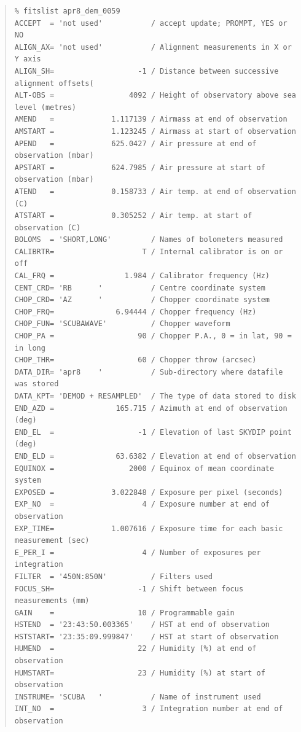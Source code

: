 \documentclass[twoside,11pt]{article}
\newenvironment{myquote}{\begin{quote}\begin{small}}{\end{small}\end{quote}}
\renewcommand{\_}{\texttt{\symbol{95}}}
\begin{document}
\begin{myquote}
\begin{verbatim}
% fitslist apr8_dem_0059
ACCEPT  = 'not used'           / accept update; PROMPT, YES or NO
ALIGN_AX= 'not used'           / Alignment measurements in X or Y axis
ALIGN_SH=                   -1 / Distance between successive alignment offsets(
ALT-OBS =                 4092 / Height of observatory above sea level (metres)
AMEND   =             1.117139 / Airmass at end of observation
AMSTART =             1.123245 / Airmass at start of observation
APEND   =             625.0427 / Air pressure at end of observation (mbar)
APSTART =             624.7985 / Air pressure at start of observation (mbar)
ATEND   =             0.158733 / Air temp. at end of observation (C)
ATSTART =             0.305252 / Air temp. at start of observation (C)
BOLOMS  = 'SHORT,LONG'         / Names of bolometers measured
CALIBRTR=                    T / Internal calibrator is on or off
CAL_FRQ =                1.984 / Calibrator frequency (Hz)
CENT_CRD= 'RB      '           / Centre coordinate system
CHOP_CRD= 'AZ      '           / Chopper coordinate system
CHOP_FRQ=              6.94444 / Chopper frequency (Hz)
CHOP_FUN= 'SCUBAWAVE'          / Chopper waveform
CHOP_PA =                   90 / Chopper P.A., 0 = in lat, 90 = in long
CHOP_THR=                   60 / Chopper throw (arcsec)
DATA_DIR= 'apr8    '           / Sub-directory where datafile was stored
DATA_KPT= 'DEMOD + RESAMPLED'  / The type of data stored to disk
END_AZD =              165.715 / Azimuth at end of observation (deg)
END_EL  =                   -1 / Elevation of last SKYDIP point (deg)
END_ELD =              63.6382 / Elevation at end of observation
EQUINOX =                 2000 / Equinox of mean coordinate system
EXPOSED =             3.022848 / Exposure per pixel (seconds)
EXP_NO  =                    4 / Exposure number at end of observation
EXP_TIME=             1.007616 / Exposure time for each basic measurement (sec)
E_PER_I =                    4 / Number of exposures per integration
FILTER  = '450N:850N'          / Filters used
FOCUS_SH=                   -1 / Shift between focus measurements (mm)
GAIN    =                   10 / Programmable gain
HSTEND  = '23:43:50.003365'    / HST at end of observation
HSTSTART= '23:35:09.999847'    / HST at start of observation
HUMEND  =                   22 / Humidity (%) at end of observation
HUMSTART=                   23 / Humidity (%) at start of observation
INSTRUME= 'SCUBA   '           / Name of instrument used
INT_NO  =                    3 / Integration number at end of observation

\end{verbatim}
\end{myquote}
\end{document}
